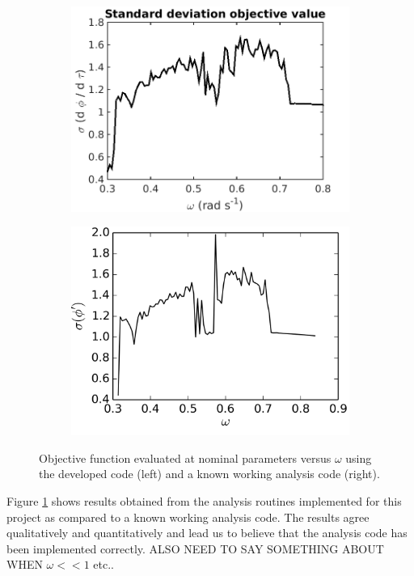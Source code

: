 \documentclass[11pt]{article}
\begin{document}
\begin{figure}[hbt!]
\centering
\begin{subfigure}{.5\textwidth}
\centering
\includegraphics[width=.99\linewidth]{verify}
\end{subfigure}%
\begin{subfigure}{.5\textwidth}
\centering
\includegraphics[width=.99\linewidth]{compare}
\end{subfigure}
\caption{Objective function evaluated at nominal
parameters versus $\omega$ using the developed code (left)
and a known working analysis code (right).}
\label{fig:verify}
\end{figure}

Figure \ref{fig:verify} shows results
obtained from the analysis routines implemented for this
project as compared to a known working analysis code.
The results agree qualitatively and quantitatively
and lead us to believe that the analysis code has
been implemented correctly.
ALSO NEED TO SAY SOMETHING ABOUT WHEN $\omega << 1$ etc..
\end{document}

